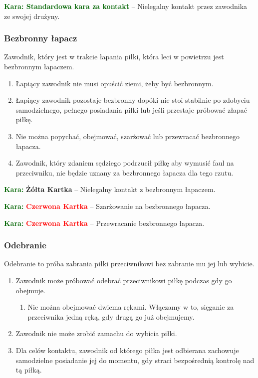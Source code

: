 \documentclass[11pt,a4paper]{article}
\newcommand\redcard[1]{\bgroup\textcolor{darkgreen}{\textbf{Kara: }}\bgroup\textcolor{red}{\textbf{Czerwona Kartka}} -- #1}
\newcommand\yellowcard[1]{\bgroup\textcolor{darkgreen}{\textbf{Kara: }}\bgroup\textcolor{darkyellow}{\textbf{Żółta Kartka}} -- #1}
\newcommand\penaltyd[2]{\bgroup\textcolor{darkgreen}{\textbf{Kara: #1}} -- #2}
\begin{document}
\penaltyd{Standardowa kara za kontakt}{Nielegalny kontakt przez zawodnika ze swojej drużyny.}

\subsubsection{Bezbronny łapacz}
Zawodnik, który jest w trakcie łapania piłki, która leci w powietrzu jest bezbronnym łapaczem.
\begin{enumerate}
  \item Łapiący zawodnik nie musi opuścić ziemi, żeby być bezbronnym.
  \item Łapiący zawodnik pozostaje bezbronny dopóki nie stoi stabilnie po zdobyciu samodzielnego, pełnego posiadania piłki lub jeśli przestaje próbować złapać piłkę.
  \item Nie można popychać, obejmować, szarżować lub przewracać bezbronnego łapacza.
  \item Zawodnik, który zdaniem sędziego podrzucił piłkę aby wymusić faul na przeciwniku, nie będzie uznany za bezbronnego łapacza dla tego rzutu.
\end{enumerate}

\yellowcard{Nielegalny kontakt z bezbronnym łapaczem.}

\redcard{Szarżowanie na bezbronnego łapacza.}

\redcard{Przewracanie bezbronnego łapacza.}

\subsubsection{Odebranie}
Odebranie to próba zabrania piłki przeciwnikowi bez zabranie mu jej lub wybicie.
\begin{enumerate}
  \item Zawodnik może próbować odebrać przeciwnikowi piłkę podczas gdy go obejmuje.
  \begin{enumerate}
    \item Nie można obejmować dwiema rękami. Włączamy w to, sięganie za przeciwnika jedną ręką, gdy drugą go już obejmujemy.
  \end{enumerate}
  \item Zawodnik nie może zrobić zamachu do wybicia piłki.
  \item Dla celów kontaktu, zawodnik od którego piłka jest odbierana zachowuje samodzielne posiadanie jej do momentu, gdy straci bezpośrednią kontrolę nad tą piłką.
\end{enumerate}
\end{document}
